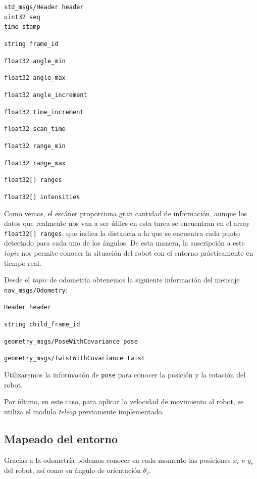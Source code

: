    \texttt{std\_msgs/Header header} 
\\ \tab \texttt{uint32 seq}
\\ \tab \texttt{time stamp} 

 \texttt{string frame\_id} 
 
 \texttt{float32 angle\_min} 
 
 \texttt{float32 angle\_max} 
 
 \texttt{float32 angle\_increment} 
 
 \texttt{float32 time\_increment} 
 
 \texttt{float32 scan\_time} 
 
 \texttt{float32 range\_min} 
 
 \texttt{float32 range\_max} 
 
 \texttt{float32[] ranges} 
 
 \texttt{float32[] intensities} 


Como vemos, el escáner proporciona gran cantidad de información, aunque los datos que realmente nos van a ser útiles en esta tarea se encuentran en el array \texttt{float32[] ranges}, que indica la distancia a la que se encuentra cada punto detectado para cada uno de los ángulos. De esta manera, la suscripción a este \emph{topic} nos permite conocer la situación del robot con el entorno prácticamente en tiempo real. 

Desde el \textit{topic} de odometría obtenemos la siguiente información del mensaje \texttt{nav\_msgs/Odometry}:
 
 \texttt{Header header}
 
 \texttt{string child\_frame\_id}
 
\texttt{geometry\_msgs/PoseWithCovariance pose}
 
 \texttt{geometry\_msgs/TwistWithCovariance twist}
 
Utilizaremos la información de \texttt{pose} para conocer la posición y la rotación del robot.

Por último, en este caso, para aplicar la velocidad de movimiento al robot, se utiliza el modulo \textit{teleop} previamente implementado.


\subsection{Mapeado del entorno}

Gracias a la odometría podemos conocer en cada momento las posiciones $x_r$ e $y_r$ del robot, así como su ángulo de orientación $\theta_r$.

